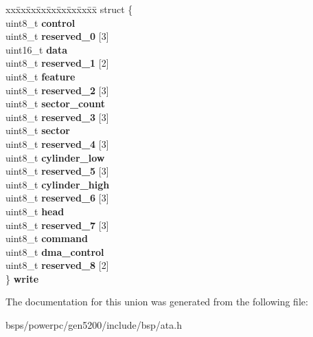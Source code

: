 \begin{DoxyCompactItemize}
\begin{tabbing}
\end{tabbing}\item 
\mbox{\label{unionata__drive__registers_acb201accd5788799c2637dd0e0e23368}} 
\begin{tabbing}
xx\=xx\=xx\=xx\=xx\=xx\=xx\=xx\=xx\=\kill
struct \{\\
\>uint8\_t {\bfseries control}\\
\>uint8\_t {\bfseries reserved\_0} \mbox{[}3\mbox{]}\\
\>uint16\_t {\bfseries data}\\
\>uint8\_t {\bfseries reserved\_1} \mbox{[}2\mbox{]}\\
\>uint8\_t {\bfseries feature}\\
\>uint8\_t {\bfseries reserved\_2} \mbox{[}3\mbox{]}\\
\>uint8\_t {\bfseries sector\_count}\\
\>uint8\_t {\bfseries reserved\_3} \mbox{[}3\mbox{]}\\
\>uint8\_t {\bfseries sector}\\
\>uint8\_t {\bfseries reserved\_4} \mbox{[}3\mbox{]}\\
\>uint8\_t {\bfseries cylinder\_low}\\
\>uint8\_t {\bfseries reserved\_5} \mbox{[}3\mbox{]}\\
\>uint8\_t {\bfseries cylinder\_high}\\
\>uint8\_t {\bfseries reserved\_6} \mbox{[}3\mbox{]}\\
\>uint8\_t {\bfseries head}\\
\>uint8\_t {\bfseries reserved\_7} \mbox{[}3\mbox{]}\\
\>uint8\_t {\bfseries command}\\
\>uint8\_t {\bfseries dma\_control}\\
\>uint8\_t {\bfseries reserved\_8} \mbox{[}2\mbox{]}\\
\} {\bfseries write}\\

\end{tabbing}\end{DoxyCompactItemize}


The documentation for this union was generated from the following file\+:\begin{DoxyCompactItemize}
\item 
bsps/powerpc/gen5200/include/bsp/ata.\+h\end{DoxyCompactItemize}
